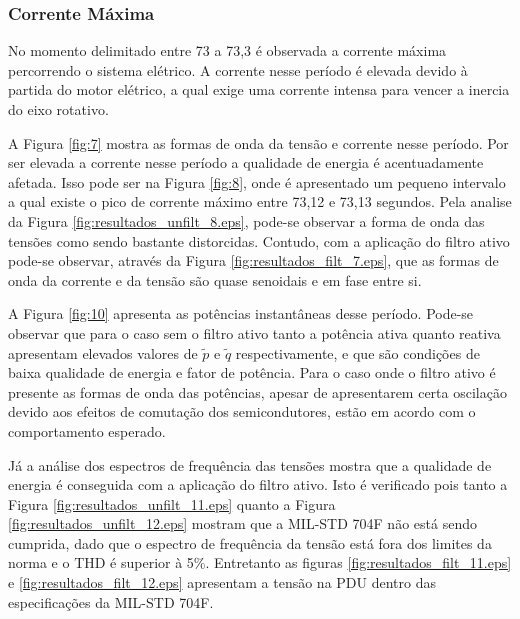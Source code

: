 \FloatBarrier

\subsubsection{Corrente Máxima}

No momento delimitado entre 73 a 73,3 é observada a corrente máxima percorrendo o sistema elétrico. A corrente nesse período é elevada devido à partida do motor elétrico, a qual exige uma corrente intensa para vencer a inercia do eixo rotativo.

A Figura \ref{fig:7} mostra as formas de onda da tensão e corrente nesse período. Por ser elevada a corrente nesse período a qualidade de energia é acentuadamente afetada. Isso pode ser na Figura \ref{fig:8}, onde é apresentado um pequeno intervalo a qual existe o pico de corrente máximo entre 73,12 e 73,13 segundos. Pela analise da Figura \ref{fig:resultados_unfilt_8.eps}, pode-se observar a forma de onda das tensões como sendo bastante distorcidas. Contudo, com a aplicação do filtro ativo pode-se observar, através da Figura \ref{fig:resultados_filt_7.eps}, que as formas de onda da corrente e da tensão são quase senoidais e em fase entre si.

A Figura \ref{fig:10} apresenta as potências instantâneas desse período. Pode-se observar que para o caso sem o filtro ativo tanto a potência ativa quanto reativa apresentam elevados valores de $\tilde{p}$ e $\tilde{q}$ respectivamente, e que são condições de baixa qualidade de energia e fator de potência. Para o caso onde o filtro ativo é presente as formas de onda das potências, apesar de apresentarem certa oscilação devido aos efeitos de comutação dos semicondutores, estão em acordo com o comportamento esperado.

Já a análise dos espectros de frequência das tensões mostra que a qualidade de energia é conseguida com a aplicação do filtro ativo. Isto é verificado pois tanto a Figura \ref{fig:resultados_unfilt_11.eps} quanto a Figura \ref{fig:resultados_unfilt_12.eps} mostram que a MIL-STD 704F não está sendo cumprida, dado que o espectro de frequência da tensão está fora dos limites da norma e o THD é superior à 5\%. Entretanto as figuras \ref{fig:resultados_filt_11.eps} e \ref{fig:resultados_filt_12.eps} apresentam a tensão na PDU dentro das especificações da MIL-STD 704F.

